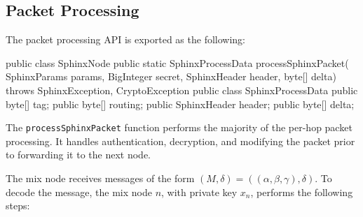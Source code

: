 \documentclass[final,dissertation.tex]{subfiles}
\begin{document}
%

\subsection{Packet Processing}

The packet processing API is exported as the following:

\begin{javacode}
public class SphinxNode {
    public static SphinxProcessData processSphinxPacket(
        SphinxParams params, 
        BigInteger secret, 
        SphinxHeader header, byte[] delta)
        throws SphinxException, CryptoException
}
public class SphinxProcessData {
    public byte[] tag;
    public byte[] routing;
    public SphinxHeader header;
    public byte[] delta;
}
\end{javacode}

The \verb|processSphinxPacket| function performs the majority of the per-hop packet processing. It handles authentication, decryption, and modifying the packet prior to forwarding it to the next node.

The mix node receives messages of the form $(M, \delta) = ((\alpha, \beta, \gamma), \delta)$. To decode the message, the mix node $n$, with private key $x_n$, performs the following steps:
\end{document}

